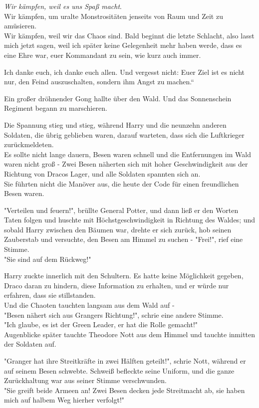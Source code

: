 {\emph{Wir kämpfen, weil es uns Spaß macht}.\\ Wir kämpfen, um uralte Monstrositäten jenseits von Raum und Zeit zu amüsieren.\\ Wir kämpfen, weil wir das Chaos sind. Bald beginnt die letzte Schlacht, also lasst mich jetzt sagen, weil ich später keine Gelegenheit mehr haben werde, dass es eine Ehre war, euer Kommandant zu sein, wie kurz auch immer.

Ich danke euch, ich danke euch allen. Und vergesst nicht: Euer Ziel ist es nicht nur, den Feind auszuschalten, sondern ihm Angst zu machen.“

Ein großer dröhnender Gong hallte über den Wald. Und das Sonnenschein Regiment begann zu marschieren.

Die Spannung stieg und stieg, während Harry und die neunzehn anderen Soldaten, die übrig geblieben waren, darauf warteten, dass sich die Luftkrieger zurückmeldeten.\\ Es sollte nicht lange dauern, Besen waren schnell und die Entfernungen im Wald waren nicht groß - Zwei Besen näherten sich mit hoher Geschwindigkeit aus der Richtung von Dracos Lager, und alle Soldaten spannten sich an.\\ Sie führten nicht die Manöver aus, die heute der Code für einen freundlichen Besen waren.

"Verteilen und feuern!", brüllte General Potter, und dann ließ er den Worten Taten folgen und huschte mit Höchstgeschwindigkeit in Richtung des Waldes; und sobald Harry zwischen den Bäumen war, drehte er sich zurück, hob seinen Zauberstab und versuchte, den Besen am Himmel zu suchen - "Frei!", rief eine Stimme.\\ "Sie sind auf dem Rückweg!"

Harry zuckte innerlich mit den Schultern. Es hatte keine Möglichkeit gegeben, Draco daran zu hindern, diese Information zu erhalten, und er würde nur erfahren, dass sie stillstanden.\\ Und die Chaoten tauchten langsam aus dem Wald auf -\\ "Besen nähert sich aus Grangers Richtung!", schrie eine andere Stimme.\\ "Ich glaube, es ist der Green Leader, er hat die Rolle gemacht!"\\ Augenblicke später tauchte Theodore Nott aus dem Himmel und tauchte inmitten der Soldaten auf.

"Granger hat ihre Streitkräfte in zwei Hälften geteilt!", schrie Nott, während er auf seinem Besen schwebte. Schweiß befleckte seine Uniform, und die ganze Zurückhaltung war aus seiner Stimme verschwunden.\\ "Sie greift beide Armeen an! Zwei Besen decken jede Streitmacht ab, sie haben mich auf halbem Weg hierher verfolgt!"

}
